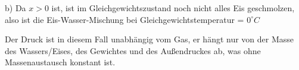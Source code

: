 b) Da \( x > 0 \) ist, ist im Gleichgewichtszustand noch nicht alles Eis geschmolzen, also ist die Eis-Wasser-Mischung bei Gleichgewichtstemperatur = \( 0^\circ C \)

Der Druck ist in diesem Fall unabhängig vom Gas, er hängt nur von der Masse des Wassers/Eises, des Gewichtes und des Außendruckes ab, was ohne Massenaustausch konstant ist.